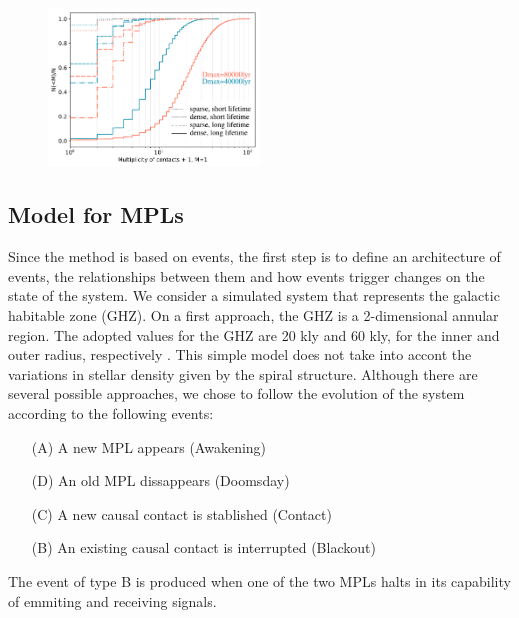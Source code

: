 

           
\begin{figure} \centering
   \includegraphics[width=0.5\textwidth]{F1.pdf}
    \label{F_number_of_contacts}
\end{figure}
        

\subsection{Model for MPLs}

Since the method is based on events, the first step is to define an
architecture of events, the relationships between them and how events
trigger changes on the state of the system.
%
We consider a simulated system that represents the galactic habitable
zone (GHZ).
%
On a first approach, the GHZ is a 2-dimensional annular region.
%
The adopted values for the GHZ are 20 kly and 60 kly, for the inner
and outer radius, respectively \citep{lineweaver_galactic_2004}.
%
This simple model does not take into accont the variations in stellar
density given by the spiral structure.
%
Although there are several possible approaches, we chose to follow the
evolution of the system according to the following events:

\begin{enumerate}
   \item[(A)] A new MPL appears (Awakening)
   \item[(D)] An old MPL dissappears (Doomsday)
   \item[(C)] A new causal contact is stablished (Contact)
   \item[(B)] An existing causal contact is interrupted (Blackout)
\end{enumerate}

The event of type B is produced when one of the two MPLs halts in its
capability of emmiting and receiving signals.

